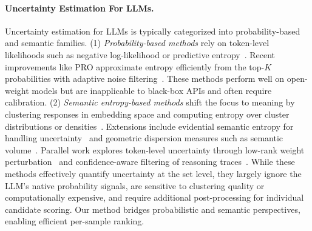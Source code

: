 \paragraph{Uncertainty Estimation For LLMs.}
Uncertainty estimation for LLMs is typically categorized into probability-based and semantic families.
(1) \textit{Probability-based methods} rely on token-level likelihoods such as negative log-likelihood or predictive entropy~\citep{guerreiro2022looking,manakul2023selfcheckgpt}. Recent improvements like PRO approximate entropy efficiently from the top-$K$ probabilities with adaptive noise filtering~\citep{nguyen2025probabilities}. These methods perform well on open-weight models but are inapplicable to black-box APIs and often require calibration.
(2) \textit{Semantic entropy-based methods} shift the focus to meaning by clustering responses in embedding space and computing entropy over cluster distributions or densities~\citep{kuhn2023semantic,farquhar2024detecting,lin2023generating, nikitin2024kernel, qiu2024semantic}. Extensions include evidential semantic entropy for handling uncertainty~\citep{kunitomo-jacquin-etal-2026-evidential} and geometric dispersion measures such as semantic volume~\citep{li2026semantic}.
Parallel work explores token-level uncertainty through low-rank weight perturbation~\citep{zhang2025tokur} and confidence-aware filtering of reasoning traces~\citep{fu2025deep}.
While these methods effectively quantify uncertainty at the set level, they largely ignore the LLM's native probability signals, are sensitive to clustering quality or computationally expensive, and require additional post-processing for individual candidate scoring.
Our method bridges probabilistic and semantic perspectives, enabling efficient per-sample ranking.